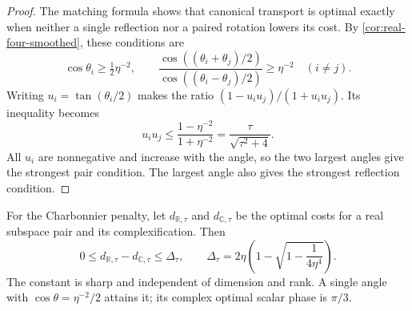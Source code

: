 \begin{proof}
The matching formula shows that canonical transport is optimal exactly
when neither a single reflection nor a paired rotation lowers its cost.
By \cref{cor:real-four-smoothed}, these conditions are
\[
 \cos\theta_i\geq\tfrac12\eta^{-2},\qquad
 \frac{\cos((\theta_i+\theta_j)/2)}
      {\cos((\theta_i-\theta_j)/2)}\geq\eta^{-2}
 \quad(i\ne j).
\]
Writing $u_i=\tan(\theta_i/2)$ makes the ratio
$(1-u_iu_j)/(1+u_iu_j)$. Its inequality becomes
\[
 u_iu_j\leq\frac{1-\eta^{-2}}{1+\eta^{-2}}
           =\frac{\tau}{\sqrt{\tau^2+4}}.
\]
All $u_i$ are nonnegative and increase with the angle, so the two largest
angles give the strongest pair condition. The largest angle also gives
the strongest reflection condition.
\end{proof}

\begin{theorem}
\label{thm:real-complex-smoothed-additive-gap}
For the Charbonnier penalty, let $d_{\mathbb R,\tau}$ and
$d_{\mathbb C,\tau}$ be the optimal costs for a real subspace pair
and its complexification. Then
\begin{equation}
 0\leq d_{\mathbb R,\tau}-d_{\mathbb C,\tau}
    \leq\Delta_\tau,
 \qquad
 \Delta_\tau=2\eta\left(1-\sqrt{1-\frac{1}{4\eta^4}}\right).
 \label{eq:real-complex-smoothed-additive-gap}
\end{equation}
The constant is sharp and independent of dimension and rank.
A single angle with $\cos\theta=\eta^{-2}/2$ attains it; its complex
optimal scalar phase is $\pi/3$.
\end{theorem}

